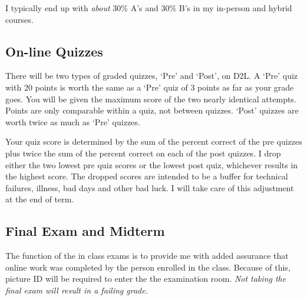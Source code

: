 \documentclass[letterpaper,10pt]{article}
\newif\ifonline
\begin{document}
  I typically end up with \emph{about} 30\%
  A's and 30\% B's in my in-person and hybrid courses.    
\fi

\subsection{On-line Quizzes}

There will be two types of graded quizzes, `Pre' and `Post', on D2L.  A `Pre'
quiz with 20 points is worth the same as a `Pre' quiz of 3 points as
far as your grade goes.  You will be given the maximum score of the two nearly identical attempts. Points are only comparable within a quiz, not between quizzes.  `Post' quizzes are worth twice as much as `Pre' quizzes.

\ifonline

  The optimal study pattern is to:
  \begin{itemize}
  \item Read the required material.
  \item Try some of the practice quiz questions.
  \item Wait a day.
  \item Review the material again and do more of the practice questions.
  \item If confident, take the `Pre' quiz, reviewing concepts between each of the two attempts. Ideally you should put a day for review of the questions between the two attempts.
  \item Wait a day.
  \item Review and take the `Post' quiz.
  \end{itemize}

\fi


Your quiz score is determined by the sum of the percent correct of the pre quizzes plus twice the sum of the percent correct on each of the post quizzes. I drop either the two lowest pre quiz scores or the lowest post quiz, whichever results in the highest score. The dropped scores are intended to be a buffer for technical
failures, illness, bad days and other bad luck.  I will take care of this adjustment at the end of term.  

\subsection{Final Exam and Midterm}

The function of the in class exams is to provide me with added assurance that online work was completed by the person enrolled in the class.  Because of this, picture ID will be required to enter the the examination room.  \emph{Not taking the final exam will result in a failing grade.}
\end{document}
